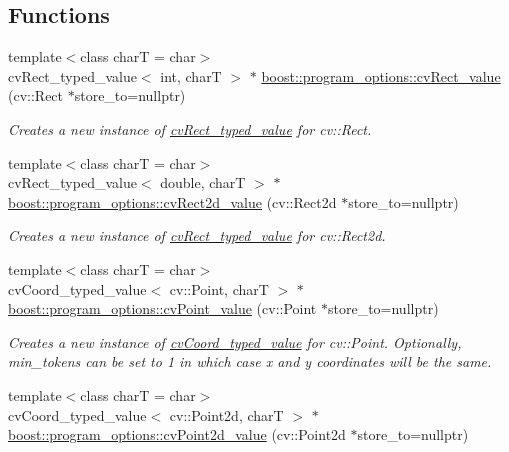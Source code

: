 \subsection*{Functions}
\begin{DoxyCompactItemize}
\item 
{\footnotesize template$<$class charT  = char$>$ }\\cv\+Rect\+\_\+typed\+\_\+value$<$ int, charT $>$ $\ast$ \hyperlink{group___imagery_module_ga4c86fa93534ee8f020d46b81f7513c8a}{boost\+::program\+\_\+options\+::cv\+Rect\+\_\+value} (cv\+::\+Rect $\ast$store\+\_\+to=nullptr)
\begin{DoxyCompactList}\small\item\em Creates a new instance of \hyperlink{structboost_1_1program__options_1_1cv_rect__typed__value}{cv\+Rect\+\_\+typed\+\_\+value} for cv\+::\+Rect. \end{DoxyCompactList}\item 
{\footnotesize template$<$class charT  = char$>$ }\\cv\+Rect\+\_\+typed\+\_\+value$<$ double, charT $>$ $\ast$ \hyperlink{group___imagery_module_gaa8c37992162927f9717159d47accbc97}{boost\+::program\+\_\+options\+::cv\+Rect2d\+\_\+value} (cv\+::\+Rect2d $\ast$store\+\_\+to=nullptr)
\begin{DoxyCompactList}\small\item\em Creates a new instance of \hyperlink{structboost_1_1program__options_1_1cv_rect__typed__value}{cv\+Rect\+\_\+typed\+\_\+value} for cv\+::\+Rect2d. \end{DoxyCompactList}\item 
{\footnotesize template$<$class charT  = char$>$ }\\cv\+Coord\+\_\+typed\+\_\+value$<$ cv\+::\+Point, charT $>$ $\ast$ \hyperlink{group___imagery_module_ga9a85fe711b2ade00ca9bb9288d405d98}{boost\+::program\+\_\+options\+::cv\+Point\+\_\+value} (cv\+::\+Point $\ast$store\+\_\+to=nullptr)
\begin{DoxyCompactList}\small\item\em Creates a new instance of \hyperlink{structboost_1_1program__options_1_1cv_coord__typed__value}{cv\+Coord\+\_\+typed\+\_\+value} for cv\+::\+Point. Optionally, min\+\_\+tokens can be set to 1 in which case x and y coordinates will be the same. \end{DoxyCompactList}\item 
{\footnotesize template$<$class charT  = char$>$ }\\cv\+Coord\+\_\+typed\+\_\+value$<$ cv\+::\+Point2d, charT $>$ $\ast$ \hyperlink{group___imagery_module_ga18ab1a2491f19ae825e658aee9ff5f4e}{boost\+::program\+\_\+options\+::cv\+Point2d\+\_\+value} (cv\+::\+Point2d $\ast$store\+\_\+to=nullptr)

\end{DoxyCompactItemize}
